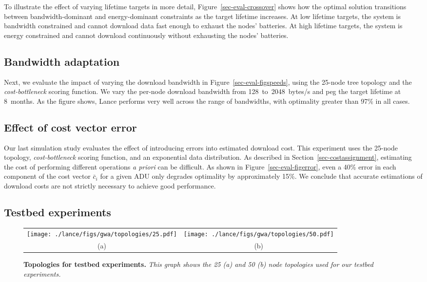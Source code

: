 To illustrate the effect of varying lifetime targets in more detail,
Figure~\ref{sec-eval-crossover} shows how the optimal solution
transitions between bandwidth-dominant and energy-dominant constraints as the
target lifetime increases. At low lifetime targets, the system is 
bandwidth constrained and cannot download data fast enough to exhaust the 
nodes' batteries.  
At high lifetime targets, the system is energy constrained and
cannot download continuously without exhausting the nodes' batteries.  

\subsection{Bandwidth adaptation} 
\label{sec-eval-params}

Next, we evaluate the impact of varying the download bandwidth in
Figure~\ref{sec-eval-figspeeds}, using the 25-node tree topology and
the \emph{cost-bottleneck} scoring function. We vary the per-node download
bandwidth from 128~to~2048~bytes/s and peg the target lifetime at
8~months. As the figure shows, Lance performs very well
across the range of bandwidths, with optimality greater than
97\% in all cases.

\subsection{Effect of cost vector error}

Our last simulation study evaluates the effect of introducing errors into
estimated download cost. This experiment uses the 25-node topology,
\emph{cost-bottleneck} scoring function, and an exponential data
distribution.  As described in Section~\ref{sec-costassignment}, estimating
the cost of performing different operations {\em a priori} can be difficult.
As shown in Figure~\ref{sec-eval-figerror}, even a 40\% error in each
component of the cost vector $\bar{c}_i$ for a given ADU only degrades
optimality by approximately 15\%. We conclude that accurate estimations
of download costs are not strictly necessary to achieve good performance.


\subsection{Testbed experiments}
\label{sec-eval-policies}

\begin{figure*}[t]
\begin{center}
\begin{tabular}{cc}
\texttt{[image: ./lance/figs/gwa/topologies/25.pdf]} &
\texttt{[image: ./lance/figs/gwa/topologies/50.pdf]} \\
(a) &
(b)\\
\end{tabular}
\end{center}
\caption{\small {\bf Topologies for testbed experiments.} 
{\em This graph shows the 25 (a) and 50 (b) node topologies used for our testbed
experiments.}}
\label{sec-eval-topologies}
\end{figure*}

